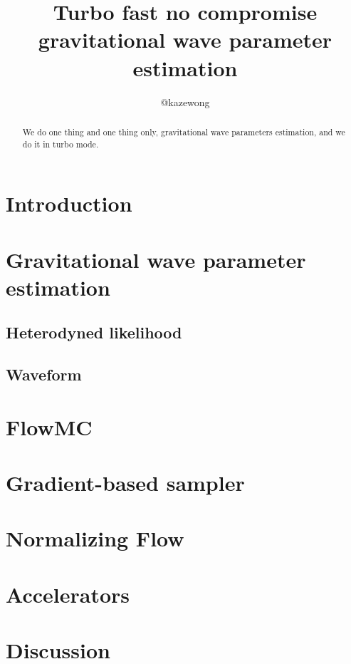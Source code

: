 \documentclass[twocolumn]{aastex631}
\begin{document}
\title{Turbo fast no compromise gravitational wave parameter estimation}

\author{@kazewong}

\begin{abstract}
We do one thing and one thing only, gravitational wave parameters estimation, and we do it in turbo mode.
\end{abstract}

\section{Introduction}
\label{sec:intro}

\section{Gravitational wave parameter estimation}

\subsection{Heterodyned likelihood}

\subsection{Waveform}

\section{FlowMC}

\section{Gradient-based sampler}
\label{sec:gradient}

\section{Normalizing Flow}
\label{sec:flow}

\section{Accelerators}
\label{sec:accelerators}

\section{Discussion}
\end{document}

